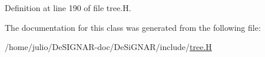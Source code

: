 Definition at line 190 of file tree.\+H.



The documentation for this class was generated from the following file\+:\begin{DoxyCompactItemize}
\item 
/home/julio/\+De\+S\+I\+G\+N\+A\+R-\/doc/\+De\+Si\+G\+N\+A\+R/include/\hyperlink{tree_8_h}{tree.\+H}\end{DoxyCompactItemize}
